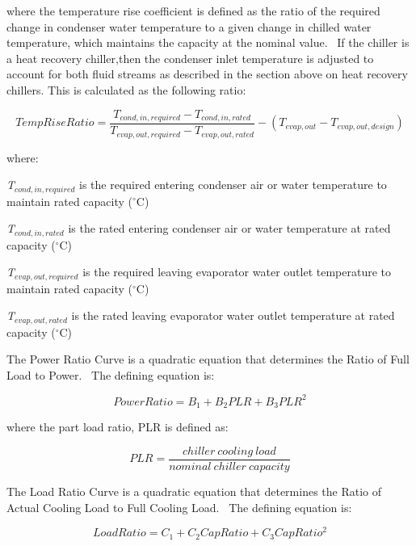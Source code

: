 where the temperature rise coefficient is defined as the ratio of the required change in condenser water temperature to a given change in chilled water temperature, which maintains the capacity at the nominal value.~ If the chiller is a heat recovery chiller,then the condenser inlet temperature is adjusted to account for both fluid streams as described in the section above on heat recovery chillers. This is calculated as the following ratio:

\begin{equation}
TempRiseRatio = \frac{{{T_{cond, in,required}} - {T_{cond,in,rated}}}}{{{T_{evap, out,required}} - {T_{evap,out,rated}}}} - \left( {{T_{evap,out}} - {T_{evap,out,design}}} \right)
\end{equation}

where:

\emph{T\(_{cond,in,required}\)} is the required entering condenser air or water temperature to maintain rated capacity (\(^{\circ}\)C)

\emph{T\(_{cond,in,rated}\)} is the rated entering condenser air or water temperature at rated capacity (\(^{\circ}\)C)

\emph{T\(_{evap,out,required}\)} is the required leaving evaporator water outlet temperature to maintain rated capacity (\(^{\circ}\)C)

\emph{T\(_{evap,out,rated}\)} is the rated leaving evaporator water outlet temperature at rated capacity (\(^{\circ}\)C)

The Power Ratio Curve is a quadratic equation that determines the Ratio of Full Load to Power.~ The defining equation is:

\begin{equation}
PowerRatio = {B_1} + {B_2}PLR + {B_3}PL{R^2}
\end{equation}

where the part load ratio, PLR is defined as:

\begin{equation}
PLR = \frac{{chiller~cooling~load}}{{nominal~chiller~capacity}}
\end{equation}

The Load Ratio Curve is a quadratic equation that determines the Ratio of Actual Cooling Load to Full Cooling Load.~ The defining equation is:

\begin{equation}
LoadRatio = {C_1} + {C_2}CapRatio + {C_3}CapRati{o^2}
\end{equation}

